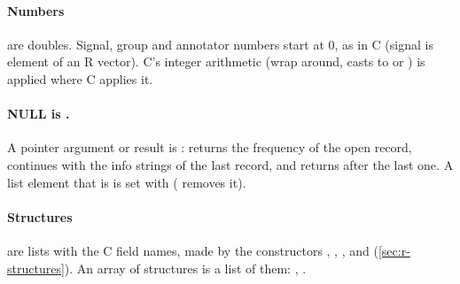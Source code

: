 \paragraph{Numbers} are doubles. Signal, group and annotator numbers start at 0, as in C
(signal  is element  of an R vector). C's integer arithmetic (wrap
around, casts to  or ) is applied where C applies it.

\paragraph{NULL is .} A  pointer argument or result is
:  returns the frequency of the open record,
 continues with the info strings of the last record, and
 returns  after the last one. A list element that is
 is set with  ( removes it).

\paragraph{Structures} are lists with the C field names, made by the constructors
, , ,  and
 (\cref{sec:r-structures}). An array of structures is a list of them:
, .

